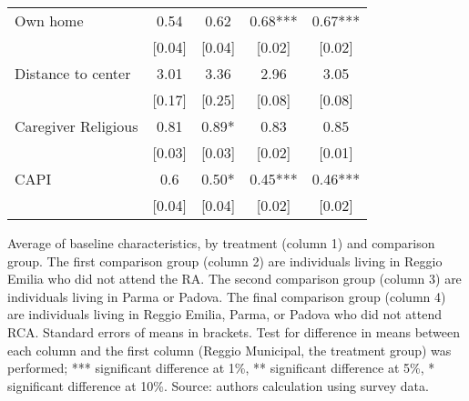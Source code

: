 \begin{table}[H]
\begin{tabular}{l cccc}
Own home  & 0.54 & 0.62 & 0.68*** & 0.67*** \\
 & [0.04] & [0.04] & [0.02] & [0.02] \\
Distance to center  & 3.01 & 3.36 & 2.96 & 3.05 \\
 & [0.17] & [0.25] & [0.08] & [0.08] \\
Caregiver Religious  & 0.81 & 0.89* & 0.83 & 0.85 \\
 & [0.03] & [0.03] & [0.02] & [0.01] \\
CAPI  & 0.6 & 0.50* & 0.45*** & 0.46*** \\
 & [0.04] & [0.04] & [0.02] & [0.02] \\
\hline
\end{tabular}
\vspace{1ex}

\raggedright{
\footnotesize{Average of baseline characteristics, by treatment (column 1) and comparison group.
The first comparison group (column 2) are individuals living in Reggio Emilia who did not attend the RA. The second comparison group (column 3) are individuals living in Parma or Padova. The final comparison group (column 4) are individuals living in Reggio Emilia, Parma, or Padova who did not attend RCA.
Standard errors of means in brackets. Test for difference in means between each column and the first column (Reggio Municipal, the treatment group) was performed; *** significant difference at 1\%, ** significant difference at 5\%, * significant difference at 10\%. Source: authors calculation using survey data.}
}
\end{table}
